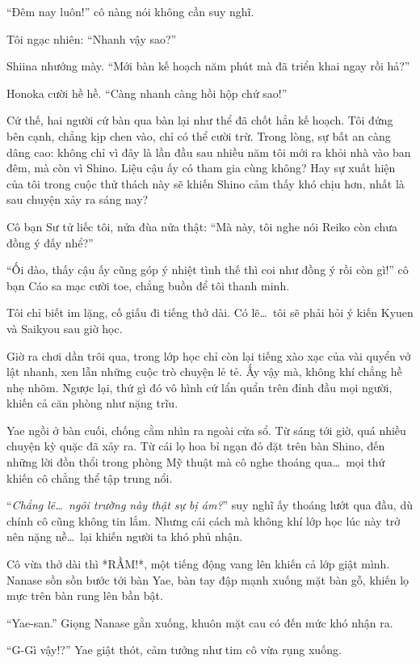 \documentclass[../main.tex]{subfiles}
\begin{document}
``Đêm nay luôn!'' cô nàng nói không cần suy nghĩ.

Tôi ngạc nhiên: ``Nhanh vậy sao?''

Shiina nhướng mày. ``Mới bàn kế hoạch năm phút mà đã triển khai ngay rồi hả?''

Honoka cười hề hề. ``Càng nhanh càng hồi hộp chứ sao!''

Cứ thế, hai người cứ bàn qua bàn lại như thể đã chốt hẳn kế hoạch. Tôi đứng bên cạnh, chẳng kịp chen vào, chỉ có thể cười trừ. Trong lòng, sự bất an càng dâng cao: không chỉ vì đây là lần đầu sau nhiều năm tôi mới ra khỏi nhà vào ban đêm, mà còn vì Shino. Liệu cậu ấy có tham gia cùng không? Hay sự xuất hiện của tôi trong cuộc thử thách này sẽ khiến Shino cảm thấy khó chịu hơn, nhất là sau chuyện xảy ra sáng nay?

Cô bạn Sư tử liếc tôi, nửa đùa nửa thật: ``Mà này, tôi nghe nói Reiko còn chưa đồng ý đấy nhể?''

``Ối dào, thấy cậu ấy cũng góp ý nhiệt tình thế thì coi như đồng ý rồi còn gì!'' cô bạn Cáo sa mạc cười toe, chẳng buồn để tôi thanh minh.

Tôi chỉ biết im lặng, cố giấu đi tiếng thở dài. Có lẽ\dots\ tôi sẽ phải hỏi ý kiến Kyuen và Saikyou sau giờ học.

\pov{-}

Giờ ra chơi dần trôi qua, trong lớp học chỉ còn lại tiếng xào xạc của vài quyển vở lật nhanh, xen lẫn những cuộc trò chuyện lẻ tẻ. Ấy vậy mà, không khí chẳng hề nhẹ nhõm. Ngược lại, thứ gì đó vô hình cứ lẩn quẩn trên đỉnh đầu mọi người, khiến cả căn phòng như nặng trĩu.

Yae ngồi ở bàn cuối, chống cằm nhìn ra ngoài cửa sổ. Từ sáng tới giờ, quá nhiều chuyện kỳ quặc đã xảy ra. Từ cái lọ hoa bỉ ngạn đỏ đặt trên bàn Shino, đến những lời đồn thổi trong phòng Mỹ thuật mà cô nghe thoáng qua\dots\ mọi thứ khiến cô chẳng thể tập trung nổi.

``\textit{Chẳng lẽ\dots\ ngôi trường này thật sự bị ám?}'' suy nghĩ ấy thoáng lướt qua đầu, dù chính cô cũng không tin lắm. Nhưng cái cách mà không khí lớp học lúc này trở nên nặng nề\dots\ lại khiến người ta khó phủ nhận.

Cô vừa thở dài thì *RẦM!*,  một tiếng động vang lên khiến cả lớp giật mình. Nanase sồn sồn bước tới bàn Yae, bàn tay đập mạnh xuống mặt bàn gỗ, khiến lọ mực trên bàn rung lên bần bật.

``Yae-san.'' Giọng Nanase gằn xuống, khuôn mặt cau có đến mức khó nhận ra.

``G-Gì vậy!?'' Yae giật thót, cảm tưởng như tim cô vừa rụng xuống.
\end{document}
